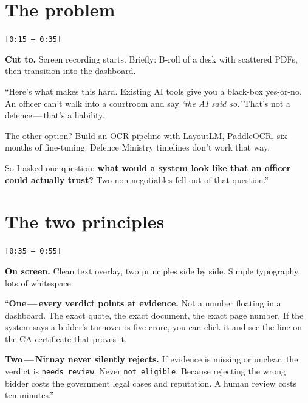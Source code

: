 \documentclass[11pt,a4paper]{article}
\newcommand{\ts}[1]{{\small\color{accent}\texttt{[#1]}}}
\begin{document}
\section{The problem}
\ts{0:15 -- 0:35}

\begin{cue}
\textbf{Cut to.} Screen recording starts. Briefly: B-roll of a desk with scattered PDFs, then transition into the dashboard.
\end{cue}

\begin{spoken}
``Here's what makes this hard. Existing AI tools give you a black-box yes-or-no. An officer can't walk into a courtroom and say \emph{`the AI said so.'} That's not a defence\,---\,that's a liability.

\smallskip
The other option? Build an OCR pipeline with LayoutLM, PaddleOCR, six months of fine-tuning. Defence Ministry timelines don't work that way.

\smallskip
So I asked one question: \textbf{what would a system look like that an officer could actually trust?} Two non-negotiables fell out of that question.''
\end{spoken}

\section{The two principles}
\ts{0:35 -- 0:55}

\begin{cue}
\textbf{On screen.} Clean text overlay, two principles side by side. Simple typography, lots of whitespace.
\end{cue}

\begin{spoken}
``\textbf{One\,---\,every verdict points at evidence.} Not a number floating in a dashboard. The exact quote, the exact document, the exact page number. If the system says a bidder's turnover is five crore, you can click it and see the line on the CA certificate that proves it.

\smallskip
\textbf{Two\,---\,Nirnay never silently rejects.} If evidence is missing or unclear, the verdict is \texttt{needs\_review}. Never \texttt{not\_eligible}. Because rejecting the wrong bidder costs the government legal cases and reputation. A human review costs ten minutes.''
\end{spoken}
\end{document}
